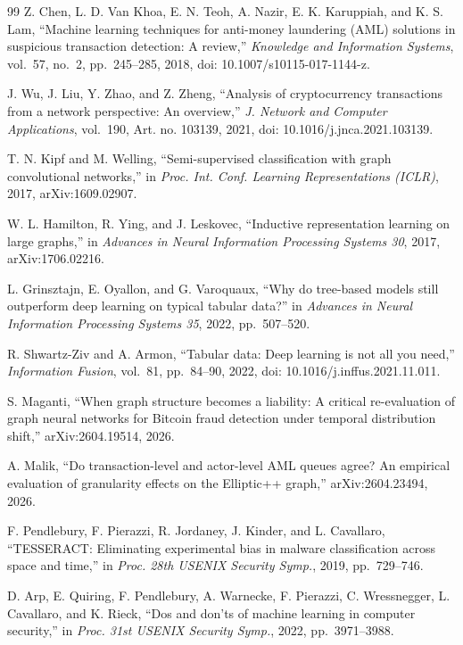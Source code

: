 \documentclass[conference]{IEEEtran}
\begin{document}
\begin{thebibliography}{99}
 Z. Chen, L. D. Van Khoa, E. N. Teoh, A. Nazir, E. K. Karuppiah, and K. S. Lam, ``Machine learning techniques for anti-money laundering (AML) solutions in suspicious transaction detection: A review,'' \emph{Knowledge and Information Systems}, vol.~57, no.~2, pp.~245--285, 2018, doi: 10.1007/s10115-017-1144-z.

 J. Wu, J. Liu, Y. Zhao, and Z. Zheng, ``Analysis of cryptocurrency transactions from a network perspective: An overview,'' \emph{J. Network and Computer Applications}, vol.~190, Art. no. 103139, 2021, doi: 10.1016/j.jnca.2021.103139.

 T. N. Kipf and M. Welling, ``Semi-supervised classification with graph convolutional networks,'' in \emph{Proc. Int. Conf. Learning Representations (ICLR)}, 2017, arXiv:1609.02907.

 W. L. Hamilton, R. Ying, and J. Leskovec, ``Inductive representation learning on large graphs,'' in \emph{Advances in Neural Information Processing Systems 30}, 2017, arXiv:1706.02216.

 L. Grinsztajn, E. Oyallon, and G. Varoquaux, ``Why do tree-based models still outperform deep learning on typical tabular data?'' in \emph{Advances in Neural Information Processing Systems 35}, 2022, pp.~507--520.

 R. Shwartz-Ziv and A. Armon, ``Tabular data: Deep learning is not all you need,'' \emph{Information Fusion}, vol.~81, pp.~84--90, 2022, doi: 10.1016/j.inffus.2021.11.011.

 S. Maganti, ``When graph structure becomes a liability: A critical re-evaluation of graph neural networks for Bitcoin fraud detection under temporal distribution shift,'' arXiv:2604.19514, 2026.

 A. Malik, ``Do transaction-level and actor-level AML queues agree? An empirical evaluation of granularity effects on the Elliptic++ graph,'' arXiv:2604.23494, 2026.

 F. Pendlebury, F. Pierazzi, R. Jordaney, J. Kinder, and L. Cavallaro, ``TESSERACT: Eliminating experimental bias in malware classification across space and time,'' in \emph{Proc. 28th USENIX Security Symp.}, 2019, pp.~729--746.

 D. Arp, E. Quiring, F. Pendlebury, A. Warnecke, F. Pierazzi, C. Wressnegger, L. Cavallaro, and K. Rieck, ``Dos and don'ts of machine learning in computer security,'' in \emph{Proc. 31st USENIX Security Symp.}, 2022, pp.~3971--3988.


\end{thebibliography}
\end{document}
